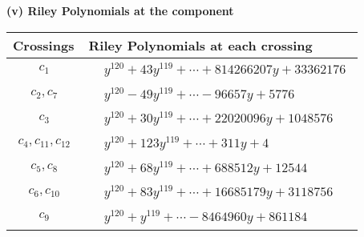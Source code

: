 \documentclass[1p]{elsarticle_modified}
\theoremstyle{definition}
\begin{document}
\flushleft \textbf{(v) Riley Polynomials at the component}\newline \\
\begin{tabular}{m{50pt}|m{274pt}}
Crossings & \hspace{64pt}Riley Polynomials at each crossing \\
\hline $$\begin{aligned}c_{1}\end{aligned}$$&$\begin{aligned}
&y^{120}+43 y^{119}+\cdots+814266207 y+33362176
\end{aligned}$\\
\hline $$\begin{aligned}c_{2},c_{7}\end{aligned}$$&$\begin{aligned}
&y^{120}-49 y^{119}+\cdots-96657 y+5776
\end{aligned}$\\
\hline $$\begin{aligned}c_{3}\end{aligned}$$&$\begin{aligned}
&y^{120}+30 y^{119}+\cdots+22020096 y+1048576
\end{aligned}$\\
\hline $$\begin{aligned}c_{4},c_{11},c_{12}\end{aligned}$$&$\begin{aligned}
&y^{120}+123 y^{119}+\cdots+311 y+4
\end{aligned}$\\
\hline $$\begin{aligned}c_{5},c_{8}\end{aligned}$$&$\begin{aligned}
&y^{120}+68 y^{119}+\cdots+688512 y+12544
\end{aligned}$\\
\hline $$\begin{aligned}c_{6},c_{10}\end{aligned}$$&$\begin{aligned}
&y^{120}+83 y^{119}+\cdots+16685179 y+3118756
\end{aligned}$\\
\hline $$\begin{aligned}c_{9}\end{aligned}$$&$\begin{aligned}
&y^{120}+y^{119}+\cdots-8464960 y+861184
\end{aligned}$\\
\hline
\end{tabular}\\~\\
\end{document}
